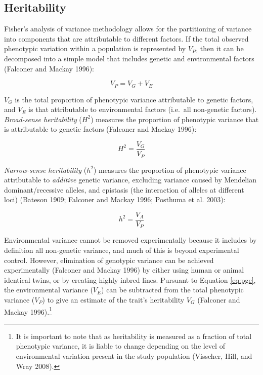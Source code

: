 \documentclass[
]{book}
\begin{document}
\hypertarget{heritability}{%
\subsection{Heritability}\label{heritability}}

Fisher's analysis of variance methodology allows for the partitioning of variance into components that are attributable to different factors. If the total observed phenotypic variation within a population is represented by \(V_{P}\), then it can be decomposed into a simple model that includes genetic and environmental factors (Falconer and Mackay 1996):

\begin{equation}
V_{P} = V_{G} + V_{E} \label{eq:pge}
\end{equation}

\(V_{G}\) is the total proportion of phenotypic variance attributable to genetic factors, and \(V_{E}\) is that attributable to environmental factors (i.e.~all non-genetic factors). \emph{Broad-sense heritability} (\(H^2\)) measures the proportion of phenotypic variance that is attributable to genetic factors (Falconer and Mackay 1996):

\[
H^2 = \frac{V_G}{V_P}
\]

\emph{Narrow-sense heritability} (\(h^2\)) measures the proportion of phenotypic variance attributable to \emph{additive} genetic variance, excluding variance caused by Mendelian dominant/recessive alleles, and epistasis (the interaction of alleles at different loci) (Bateson 1909; Falconer and Mackay 1996; Posthuma et al. 2003):

\begin{equation}
h^2 = \frac{V_A}{V_P} \label{eq:heritns}
\end{equation}

Environmental variance cannot be removed experimentally because it includes by definition all non-genetic variance, and much of this is beyond experimental control. However, elimination of genotypic variance can be achieved experimentally (Falconer and Mackay 1996) by either using human or animal identical twins, or by creating highly inbred lines. Pursuant to Equation \eqref{eq:pge}, the environmental variance (\(V_E\)) can be subtracted from the total phenotypic variance (\(V_P\)) to give an estimate of the trait's heritability \(V_G\) (Falconer and Mackay 1996).\footnote{It is important to note that as heritability is measured as a fraction of total phenotypic variance, it is liable to change depending on the level of environmental variation present in the study population (Visscher, Hill, and Wray 2008).}
\end{document}

